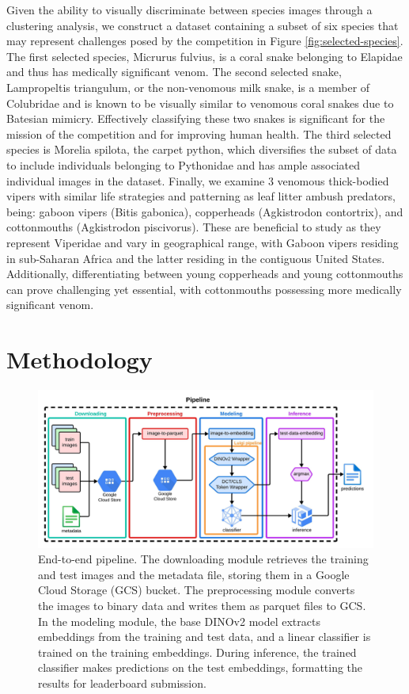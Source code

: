 \documentclass[]{ceurart}
\begin{document}
Given the ability to visually discriminate between species images through a clustering analysis, we construct a dataset containing a subset of six species that may represent challenges posed by the competition in Figure \ref{fig:selected-species}.
The first selected species, Micrurus fulvius, is a coral snake belonging to Elapidae and thus has medically significant venom. 
The second selected snake, Lampropeltis triangulum, or the non-venomous milk snake, is a member of Colubridae and is known to be visually similar to venomous coral snakes due to Batesian mimicry. 
Effectively classifying these two snakes is significant for the mission of the competition and for improving human health. 
The third selected species is Morelia spilota, the carpet python, which diversifies the subset of data to include individuals belonging to Pythonidae and has ample associated individual images in the dataset.
Finally, we examine 3 venomous thick-bodied vipers with similar life strategies and patterning as leaf litter ambush predators, being: gaboon vipers (Bitis gabonica), copperheads (Agkistrodon contortrix), and cottonmouths (Agkistrodon piscivorus). 
These are beneficial to study as they represent Viperidae and vary in geographical range, with Gaboon vipers residing in sub-Saharan Africa and the latter residing in the contiguous United States. 
Additionally, differentiating between young copperheads and young cottonmouths can prove challenging yet essential, with cottonmouths possessing more medically significant venom. 

\section{Methodology}

\begin{figure}[ht]
    \centering
    \includegraphics[width=\textwidth]{media/pipeline-snakeclef-2024.jpeg}
    \caption{
    End-to-end pipeline.
    The downloading module retrieves the training and test images and the metadata file, storing them in a Google Cloud Storage (GCS) bucket.
    The preprocessing module converts the images to binary data and writes them as parquet files to GCS.
    In the modeling module, the base DINOv2 model extracts embeddings from the training and test data, and a linear classifier is trained on the training embeddings.
    During inference, the trained classifier makes predictions on the test embeddings, formatting the results for leaderboard submission.
    }
  \label{fig:pipeline}
\end{figure}
\end{document}
